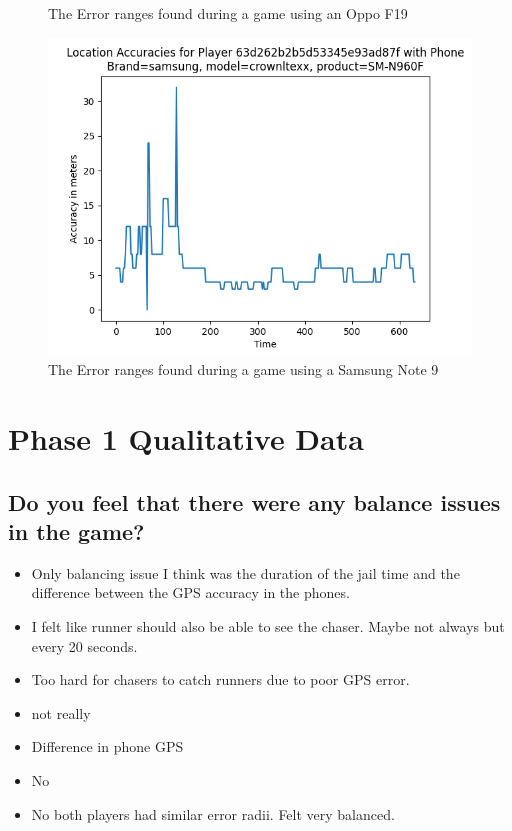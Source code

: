 \documentclass{l4proj}
\begin{document}
\begin{appendices}
\begin{figure}
    \caption{The Error ranges found during a game using an Oppo F19}
    \label{fig:oppo}
\end{figure}
\begin{figure}
    \centering
    \includegraphics[width=0.8\linewidth]{images/note9.png}
    \caption{The Error ranges found during a game using a Samsung Note 9}
    \label{fig:note9}
\end{figure}

\chapter{Phase 1 Qualitative Data}

\section{Do you feel that there were any balance issues in the game?}
\label{phase1balance}

\begin{itemize}
    \item Only balancing issue I think was the duration of the jail time and the difference between the GPS accuracy in the phones.
    \item I felt like runner should also be able to see the chaser. Maybe not always but every 20 seconds.
    \item Too hard for chasers to catch runners due to poor GPS error.
    \item not really
    \item Difference in phone GPS
    \item No
    \item No both players had similar error radii. Felt very balanced.
\end{itemize}


\end{appendices}
\end{document}
